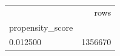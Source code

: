 \begin{tabular}{lr}
\toprule
 & rows \\
propensity\_score &  \\
\midrule
0.012500 & 1356670 \\
\bottomrule
\end{tabular}
